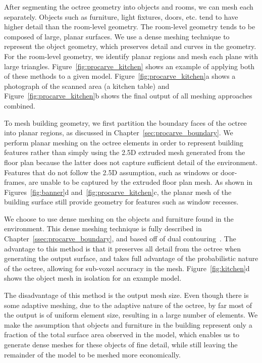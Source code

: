 \documentclass[12pt,onecolumn,oneside]{book}
\begin{document}
After segmenting the octree geometry into objects and rooms, we can mesh each separately.  Objects such as furniture, light fixtures, doors, etc. tend to have higher detail than the room-level geometry.  The room-level geometry tends to be composed of large, planar surfaces.  We use a dense meshing technique to represent the object geometry, which preserves detail and curves in the geometry.  For the room-level geometry, we identify planar regions and mesh each plane with large triangles.  Figure~\ref{fig:procarve_kitchen} shows an example of applying both of these methods to a given model.  Figure~\ref{fig:procarve_kitchen}a shows a photograph of the scanned area (a kitchen table) and Figure~\ref{fig:procarve_kitchen}b shows the final output of all meshing approaches combined.

To mesh building geometry, we first partition the boundary faces of the octree into planar regions, as discussed in Chapter~\ref{sec:procarve_boundary}.   We perform planar meshing on the octree elements in order to represent building features rather than simply using the 2.5D extruded mesh generated from the floor plan because the latter does not capture sufficient detail of the environment.  Features that do not follow the 2.5D assumption, such as windows or door-frames, are unable to be captured by the extruded floor plan mesh.  As shown in Figures~\ref{fig:banner}d and~\ref{fig:procarve_kitchen}c, the planar mesh of the building surface still provide geometry for features such as window recesses.

We choose to use dense meshing on the objects and furniture found in the environment.  This dense meshing technique is fully described in Chapter~\ref{ssec:procarve_boundary}, and based off of dual contouring~\cite{DualContouring}.  The advantage to this method is that it preserves all detail from the octree when generating the output surface, and takes full advantage of the probabilistic nature of the octree, allowing for sub-voxel accuracy in the mesh.  Figure~\ref{fig:kitchen}d shows the object mesh in isolation for an example model.  

The disadvantage of this method is the output mesh size.  Even though there is some adaptive meshing, due to the adaptive nature of the octree, by far most of the output is of uniform element size, resulting in a large number of elements.  We make the assumption that objects and furniture in the building represent only a fraction of the total surface area observed in the model, which enables us to generate dense meshes for these objects of fine detail, while still leaving the remainder of the model to be meshed more economically.
\end{document}
